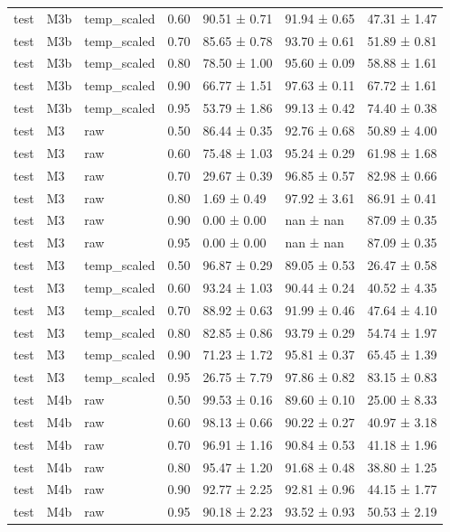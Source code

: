 \begin{tabular}{lllrlll}
test & M3b & temp\_scaled & 0.60 & 90.51 ± 0.71 & 91.94 ± 0.65 & 47.31 ± 1.47 \\
test & M3b & temp\_scaled & 0.70 & 85.65 ± 0.78 & 93.70 ± 0.61 & 51.89 ± 0.81 \\
test & M3b & temp\_scaled & 0.80 & 78.50 ± 1.00 & 95.60 ± 0.09 & 58.88 ± 1.61 \\
test & M3b & temp\_scaled & 0.90 & 66.77 ± 1.51 & 97.63 ± 0.11 & 67.72 ± 1.61 \\
test & M3b & temp\_scaled & 0.95 & 53.79 ± 1.86 & 99.13 ± 0.42 & 74.40 ± 0.38 \\
test & M3 & raw & 0.50 & 86.44 ± 0.35 & 92.76 ± 0.68 & 50.89 ± 4.00 \\
test & M3 & raw & 0.60 & 75.48 ± 1.03 & 95.24 ± 0.29 & 61.98 ± 1.68 \\
test & M3 & raw & 0.70 & 29.67 ± 0.39 & 96.85 ± 0.57 & 82.98 ± 0.66 \\
test & M3 & raw & 0.80 & 1.69 ± 0.49 & 97.92 ± 3.61 & 86.91 ± 0.41 \\
test & M3 & raw & 0.90 & 0.00 ± 0.00 & nan ± nan & 87.09 ± 0.35 \\
test & M3 & raw & 0.95 & 0.00 ± 0.00 & nan ± nan & 87.09 ± 0.35 \\
test & M3 & temp\_scaled & 0.50 & 96.87 ± 0.29 & 89.05 ± 0.53 & 26.47 ± 0.58 \\
test & M3 & temp\_scaled & 0.60 & 93.24 ± 1.03 & 90.44 ± 0.24 & 40.52 ± 4.35 \\
test & M3 & temp\_scaled & 0.70 & 88.92 ± 0.63 & 91.99 ± 0.46 & 47.64 ± 4.10 \\
test & M3 & temp\_scaled & 0.80 & 82.85 ± 0.86 & 93.79 ± 0.29 & 54.74 ± 1.97 \\
test & M3 & temp\_scaled & 0.90 & 71.23 ± 1.72 & 95.81 ± 0.37 & 65.45 ± 1.39 \\
test & M3 & temp\_scaled & 0.95 & 26.75 ± 7.79 & 97.86 ± 0.82 & 83.15 ± 0.83 \\
test & M4b & raw & 0.50 & 99.53 ± 0.16 & 89.60 ± 0.10 & 25.00 ± 8.33 \\
test & M4b & raw & 0.60 & 98.13 ± 0.66 & 90.22 ± 0.27 & 40.97 ± 3.18 \\
test & M4b & raw & 0.70 & 96.91 ± 1.16 & 90.84 ± 0.53 & 41.18 ± 1.96 \\
test & M4b & raw & 0.80 & 95.47 ± 1.20 & 91.68 ± 0.48 & 38.80 ± 1.25 \\
test & M4b & raw & 0.90 & 92.77 ± 2.25 & 92.81 ± 0.96 & 44.15 ± 1.77 \\
test & M4b & raw & 0.95 & 90.18 ± 2.23 & 93.52 ± 0.93 & 50.53 ± 2.19 \\

\end{tabular}
